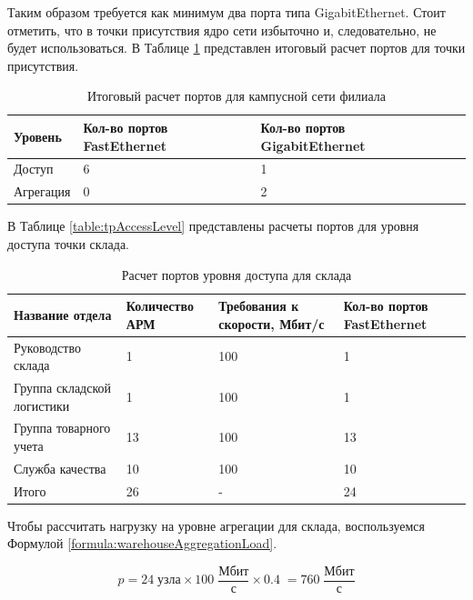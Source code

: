 \documentclass[14pt, a4paper]{extarticle}
\numberwithin{equation}{section}
\begin{document}
Таким образом требуется как минимум два порта типа GigabitEthernet.
Стоит отметить, что в точки присутствия ядро сети избыточно и, 
следовательно, не будет использоваться.
В Таблице \ref{table:filialCampusNet} представлен итоговый расчет портов для точки присутствия.

\begin{table}[H]
\centering
\small
\caption{Итоговый расчет портов для кампусной сети филиала}
\begin{tabular}{|m{2cm}|m{4cm}|m{3cm}|m{3.5cm}|}
\hline
\textbf{Уровень} & \textbf{Кол-во портов FastEthernet} & \textbf{Кол-во портов GigabitEthernet} \\
\hline
Доступ & 6 & 1 \\
\hline
Агрегация & 0 & 2 \\
\hline
\end{tabular}
\label{table:filialCampusNet}
\end{table}


В Таблице \ref{table:tpAccessLevel} представлены расчеты портов для уровня доступа 
точки склада.

\begin{table}[H]
\centering
\small
\caption{Расчет портов уровня доступа для склада}
\begin{tabular}{|m{3cm}|m{2.5cm}|m{2.5cm}|m{2.5cm}|}
\hline
\textbf{Название отдела} & \textbf{Количество АРМ} & \textbf{Требования к скорости, Мбит/с} & \textbf{Кол-во портов FastEthernet} \\
\hline
Руководство склада & 1 & 100 & 1 \\
\hline
Группа складской логистики & 1 & 100 & 1 \\
\hline
Группа товарного учета & 13 & 100 & 13 \\
\hline
Служба качества & 10 & 100 & 10 \\
\hline
Итого & 26 & - & 24 \\
\hline
\end{tabular}
\label{table:warehouseAccessLevel}
\end{table}

Чтобы рассчитать нагрузку на уровне агрегации для 
склада, воспользуемся Формулой \ref{formula:warehouseAggregationLoad}.

\begin{equation}
p = 24 \; \text{узла} \times 100\;\frac{\text{Мбит}}{\text{с}} \times 0.4 \; = 760\;\frac{\text{Мбит}}{\text{с}}
\label{formula:warehouseAggregationLoad}
\end{equation}
\end{document}
